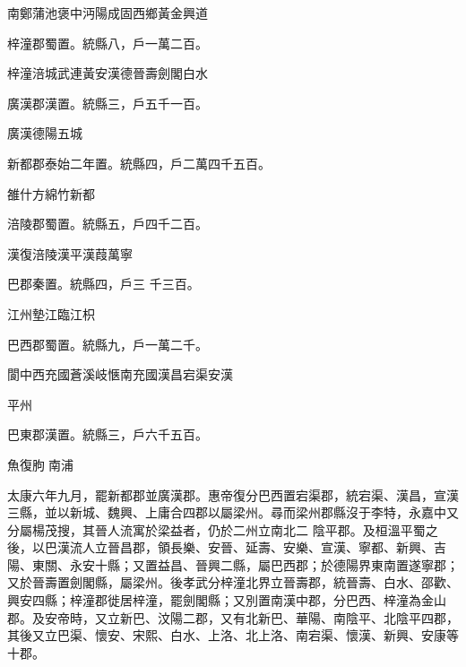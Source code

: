 \begin{pinyinscope}
 南鄭蒲池褒中沔陽成固西鄉黃金興道



 梓潼郡蜀置。統縣八，戶一萬二百。



 梓潼涪城武連黃安漢德晉壽劍閣白水



 廣漢郡漢置。統縣三，戶五千一百。



 廣漢德陽五城



 新都郡泰始二年置。統縣四，戶二萬四千五百。



 雒什方綿竹新都



 涪陵郡蜀置。統縣五，戶四千二百。



 漢復涪陵漢平漢葭萬寧



 巴郡秦置。統縣四，戶三
 千三百。



 江州墊江臨江枳



 巴西郡蜀置。統縣九，戶一萬二千。



 閬中西充國蒼溪岐愜南充國漢昌宕渠安漢



 平州



 巴東郡漢置。統縣三，戶六千五百。



 魚復朐南浦



 太康六年九月，罷新都郡並廣漢郡。惠帝復分巴西置宕渠郡，統宕渠、漢昌，宣漢三縣，並以新城、魏興、上庸合四郡以屬梁州。尋而梁州郡縣沒于李特，永嘉中又分屬楊茂搜，其晉人流寓於梁益者，仍於二州立南北二
 陰平郡。及桓溫平蜀之後，以巴漢流人立晉昌郡，領長樂、安晉、延壽、安樂、宣漢、寧都、新興、吉陽、東關、永安十縣；又置益昌、晉興二縣，屬巴西郡；於德陽界東南置遂寧郡；又於晉壽置劍閣縣，屬梁州。後孝武分梓潼北界立晉壽郡，統晉壽、白水、邵歡、興安四縣；梓潼郡徙居梓潼，罷劍閣縣；又別置南漢中郡，分巴西、梓潼為金山郡。及安帝時，又立新巴、汶陽二郡，又有北新巴、華陽、南陰平、北陰平四郡，其後又立巴渠、懷安、宋熙、白水、上洛、北上洛、南宕渠、懷漢、新興、安康等十郡。




\end{pinyinscope}
